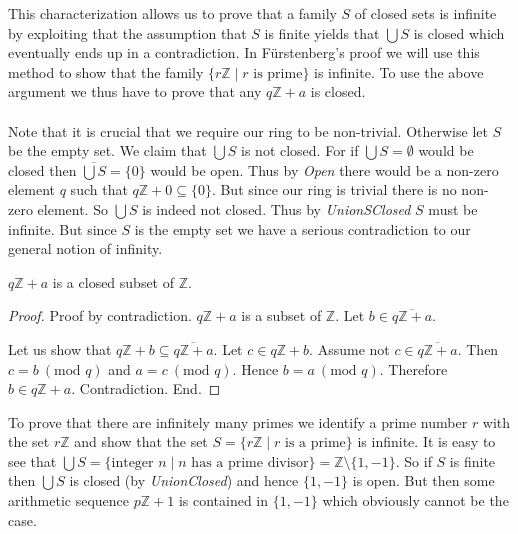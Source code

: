 \documentclass{article}
\renewcommand{\mod}{\text{mod }}
\newcommand{\Int}{\mathbb{Z}}
\begin{document}
  This characterization allows us to prove that a family $S$ of closed sets is infinite by exploiting that the assumption that $S$ is finite yields that $\bigcup S$ is closed which eventually ends up in a contradiction. In Fürstenberg's proof we will use this method to show that the family $\{ r \Int \mid r \text{ is prime} \}$ is infinite. To use the above argument we thus have to prove that any $q \Int + a$ is closed.

  \paragraph{} Note that it is crucial that we require our ring to be non-trivial. Otherwise let $S$ be the empty set. We claim that $\bigcup S$ is not closed. For if $\bigcup S = \emptyset$ would be closed then $\overline{\bigcup S} = \{ 0 \}$ would be open. Thus by \textit{Open} there would be a non-zero element $q$ such that $q \Int + 0 \subseteq \{ 0 \}$. But since our ring is trivial there is no non-zero element. So $\bigcup S$ is indeed not closed. Thus by \textit{UnionSClosed} $S$ must be infinite. But since $S$ is the empty set we have a serious contradiction to our general notion of infinity.

  \begin{forthel}
    \begin{lemma}[ArSeqClosed]
      $q \Int + a$ is a closed subset of $\Int$.
    \end{lemma}
    \begin{proof}
      Proof by contradiction. $q \Int + a$ is a subset of $\Int$. Let $b \in \overline{q \Int + a}$.

      Let us show that $q \Int + b \subseteq \overline{q \Int + a}$.
        Let $c \in q \Int + b$. Assume not $c \in \overline{q \Int + a}$. Then $c = b ~(\mod q)$ and $a = c ~(\mod q)$. Hence $b = a ~(\mod q)$. Therefore $b \in q \Int + a$. Contradiction.
      End.
    \end{proof}
  \end{forthel}

  To prove that there are infinitely many primes we identify a prime number $r$ with the set $r \Int$ and show that the set $S = \{r \Int \mid r \textrm{ is a prime} \}$ is infinite. It is easy to see that $\bigcup S = \{ \text{integer } n \mid n \text{ has a prime divisor} \} = \Int \setminus \{ 1, -1 \}$. So if $S$ is finite then $\bigcup S$ is closed (by \textit{UnionClosed}) and hence $\{ 1, -1 \}$ is open. But then some arithmetic sequence $p \Int + 1$ is contained in $\{ 1, -1 \}$ which obviously cannot be the case.
\end{document}
